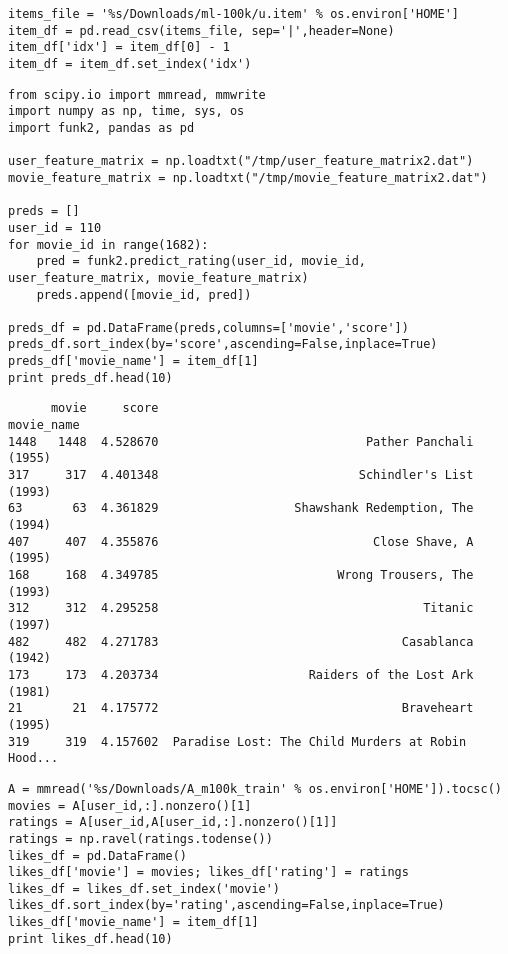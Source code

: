 \documentclass[12pt,fleqn]{article}\usepackage{../common}
\begin{document}
\begin{verbatim}
items_file = '%s/Downloads/ml-100k/u.item' % os.environ['HOME']
item_df = pd.read_csv(items_file, sep='|',header=None)
item_df['idx'] = item_df[0] - 1
item_df = item_df.set_index('idx')
\end{verbatim}


\begin{verbatim}
from scipy.io import mmread, mmwrite
import numpy as np, time, sys, os
import funk2, pandas as pd

user_feature_matrix = np.loadtxt("/tmp/user_feature_matrix2.dat")
movie_feature_matrix = np.loadtxt("/tmp/movie_feature_matrix2.dat")

preds = []
user_id = 110
for movie_id in range(1682):
    pred = funk2.predict_rating(user_id, movie_id, user_feature_matrix, movie_feature_matrix)
    preds.append([movie_id, pred])

preds_df = pd.DataFrame(preds,columns=['movie','score'])
preds_df.sort_index(by='score',ascending=False,inplace=True)
preds_df['movie_name'] = item_df[1]
print preds_df.head(10)
\end{verbatim}

\begin{verbatim}
      movie     score                                         movie_name
1448   1448  4.528670                             Pather Panchali (1955)
317     317  4.401348                            Schindler's List (1993)
63       63  4.361829                   Shawshank Redemption, The (1994)
407     407  4.355876                              Close Shave, A (1995)
168     168  4.349785                         Wrong Trousers, The (1993)
312     312  4.295258                                     Titanic (1997)
482     482  4.271783                                  Casablanca (1942)
173     173  4.203734                     Raiders of the Lost Ark (1981)
21       21  4.175772                                  Braveheart (1995)
319     319  4.157602  Paradise Lost: The Child Murders at Robin Hood...
\end{verbatim}

\begin{verbatim}
A = mmread('%s/Downloads/A_m100k_train' % os.environ['HOME']).tocsc()
movies = A[user_id,:].nonzero()[1]
ratings = A[user_id,A[user_id,:].nonzero()[1]]
ratings = np.ravel(ratings.todense())
likes_df = pd.DataFrame()
likes_df['movie'] = movies; likes_df['rating'] = ratings
likes_df = likes_df.set_index('movie')
likes_df.sort_index(by='rating',ascending=False,inplace=True)
likes_df['movie_name'] = item_df[1]
print likes_df.head(10)
\end{verbatim}
\end{document}
